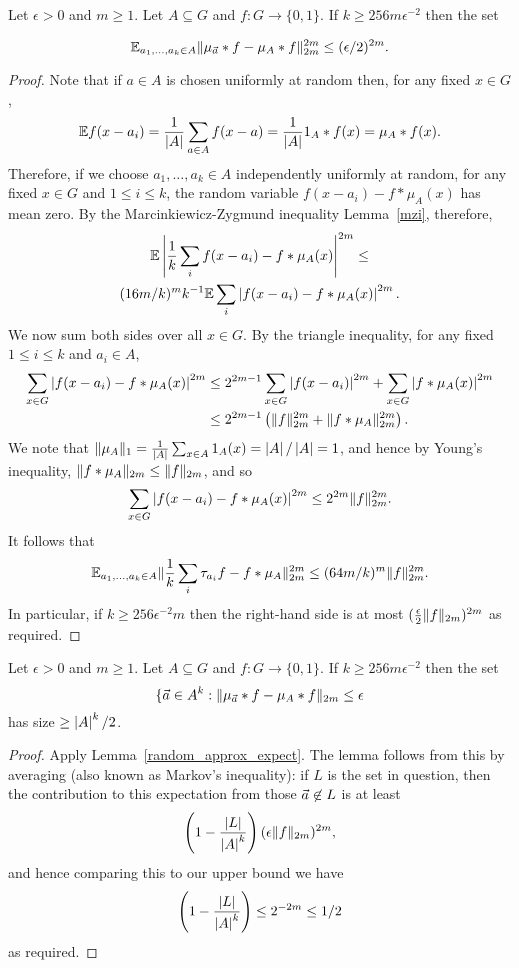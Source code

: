 \begin{lemma}\label{random_approx_expect}
Let $\epsilon>0$ and $m\geq 1$. Let $A\subseteq G$ and $f:G\to \{0,1\}$. If $k\geq 256m\epsilon^{-2}$ then the set

\[ \mathbb{E}_{a_1,\ldots,a_k\in A} \lVert  \mu_{\vec{a}}*f - \mu_A*f \rVert_{2m}^{2m} \leq (\epsilon/2)^{2m}.\] 
\end{lemma}
\begin{proof}


Note that if $a\in A$ is chosen uniformly at random then, for any fixed $x\in G$,
\[\mathbb{E} f(x-a_i)= \frac{1}{\left\lvert A\right\rvert}\sum_{a\in A}f(x-a)=\frac{1}{\left\lvert A\right\rvert}1_{A}\ast f(x)=\mu_A\ast f(x).\]
Therefore, if we choose $a_1,\ldots,a_k\in A$ independently uniformly at random, for any fixed $x\in G$ and $1\leq i\leq k$,  the random variable $f(x-a_i)-f\ast \mu_A(x)$ has mean zero. By the Marcinkiewicz-Zygmund inequality Lemma~\ref{mzi}, therefore, 
\begin{multline*}
\mathbb{E}\left\lvert  \frac{1}{k}\sum_i f(x-a_i)-f\ast \mu_A(x)\right\rvert^{2m} \leq \\(16m/k)^mk^{-1} \mathbb{E} \sum_i \left\lvert f(x-a_i)-f\ast \mu_A(x)\right\rvert^{2m}.
\end{multline*}
We now sum both sides over all $x\in G$. By the triangle inequality, for any fixed $1\leq i\leq k$ and $a_i\in A$, 
\begin{align*}
\sum_{x\in G} \left\lvert f(x-a_i)-f\ast \mu_A(x)\right\rvert^{2m}
&\leq 2^{2m-1}\sum_{x\in G}\left\lvert f(x-a_i)\right\rvert^{2m}+\sum_{x\in G}\left\lvert f\ast \mu_A(x)\right\rvert^{2m}\\
&\leq 2^{2m-1}\left( \lVert f\rVert_{2m}^{2m}+\lVert f\ast \mu_A\rVert_{2m}^{2m}\right).
\end{align*}
We note that $\lVert \mu_A\rVert_1=\frac{1}{\left\lvert A\right\rvert}\sum_{x\in A}1_{A}(x)=\left\lvert A\right\rvert/\left\lvert A\right\rvert=1$, and hence by Young's inequality, $\lVert f\ast \mu_A\rVert_{2m}\leq \lVert f\rVert_{2m}$, and so 
\[\sum_{x\in G} \left\lvert f(x-a_i)-f\ast \mu_A(x)\right\rvert^{2m}\leq 2^{2m}\lVert f\rVert_{2m}^{2m}.\]
It follows that 
\[\mathbb{E}_{a_1,\ldots,a_k\in A}\lVert \frac{1}{k}\sum_i\tau_{a_i}f-f\ast \mu_A\rVert_{2m}^{2m}\leq 
(64m/k)^m\lVert f\rVert_{2m}^{2m}.\]
In particular, if $k\geq 256\epsilon^{-2}m$ then the right-hand side is at most $(\frac{\epsilon}{2}\lVert f\rVert_{2m})^{2m}$ as required.
\end{proof}

\begin{lemma}\label{random_approx}
Let $\epsilon>0$ and $m\geq 1$. Let $A\subseteq G$ and $f:G\to \{0,1\}$. If $k\geq 256m\epsilon^{-2}$ then the set
\[\{ {\vec{a}}\in A^k : \lVert  \mu_{\vec{a}}*f - \mu_A*f \rVert_{{2m}}\leq \epsilon\]
has size $\geq \left\lvert A\right\rvert^k/2$.
\end{lemma}
\begin{proof}
Apply Lemma~\ref{random_approx_expect}. The lemma follows from this by averaging (also known as Markov's inequality): if $L$ is the set in question, then the contribution to this expectation from those ${\vec{a}}\not\in L$ is at least
\[\left( 1-\frac{\left\lvert L\right\rvert}{\left\lvert A\right\rvert^k}\right)(\epsilon \lVert f\rVert_{2m})^{2m},\]
and hence comparing this to our upper bound we have
\[\left( 1-\frac{\left\lvert L\right\rvert}{\left\lvert A\right\rvert^k}\right)\leq 2^{-2m}\leq 1/2\]
as required.
\end{proof}

